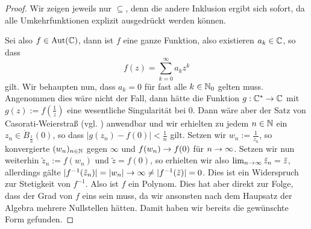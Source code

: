 \begin{proof}
  Wir zeigen jeweils nur $\subseteq$, denn die andere Inklusion ergibt
  sich sofort, da alle Umkehrfunktionen explizit ausgedrückt werden
  können.

  Sei also $f \in \operatorname{Aut}(\mathbb{C})$, dann ist $f$ eine ganze Funktion, also
  existieren $a_k \in \mathbb{C}$, so dass
  \[
  f(z) = \sum_{k=0}^\infty a_k z^k
  \]
  gilt. Wir behaupten nun, dass $a_k = 0$ für fast alle $k \in \mathbb{N}_0$
  gelten muss. Angenommen dies wäre nicht der Fall, dann hätte die
  Funktion $g: \mathbb{C}^\ast \rightarrow \mathbb{C}$ mit $g(z) := f(\frac{1}{z})$ eine
  wesentliche Singularität bei $0$. Dann wäre aber der Satz von
  Casorati-Weierstraß (vgl. \cite[Satz 6.11]{Kas}) anwendbar und wir
  erhielten zu jedem $n \in \mathbb{N}$
  ein $z_n \in \dot B_{\frac{1}{n}}(0)$, so dass $|g(z_n) - f(0)| <
  \frac{1}{n}$ gilt. Setzen wir $w_n := \frac{1}{z_n}$, so konvergierte
  $(w_n)_{n \in \mathbb{N}}$ gegen $\infty$ und $f(w_n) \rightarrow f(0)$ für $n \rightarrow
  \infty$. Setzen wir nun weiterhin $\tilde z_n := f(w_n)$ und $\tilde
  z = f(0)$, so erhielten wir also $\lim_{n \rightarrow \infty} \tilde z_n =
  \tilde z$, allerdings gälte $|f^{-1}(\tilde z_n)| = |w_n| \rightarrow \infty
  \neq |f^{-1}(\tilde z)| = 0$. Dies ist ein Widerspruch zur
  Stetigkeit von $f^{-1}$. Also ist $f$ ein Polynom. Dies hat aber
  direkt zur Folge, dass der Grad von $f$ eins sein muss, da wir
  ansonsten nach dem Haupsatz der Algebra mehrere Nullstellen
  hätten. Damit haben wir bereits die gewünschte Form gefunden.


\end{proof}
